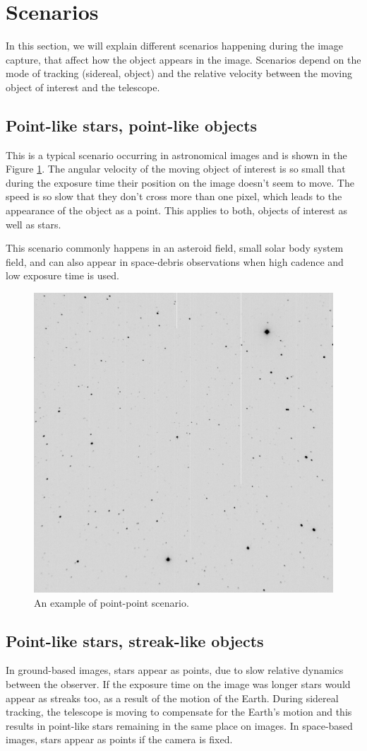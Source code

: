 \section{Scenarios} \label{sec:scenarios}

In this section, we will explain different scenarios happening during the image capture, that affect how the object appears in the image. Scenarios depend on the mode of tracking (sidereal, object) and the relative velocity between the moving object of interest and the telescope. 

\subsection{Point-like stars, point-like objects}
This is a typical scenario occurring in astronomical images and is shown in the Figure \ref{fig:pointpoint1}. The angular velocity of the moving object of interest is so small that during the exposure time their position on the image doesn't seem to move. The speed is so slow that they don't cross more than one pixel, which leads to the appearance of the object as a point. This applies to both, objects of interest as well as stars. 

This scenario commonly happens in an asteroid field, small solar body system field, and can also appear in space-debris observations when high cadence and low exposure time is used. 

\begin{figure}[!h]
    \centering
    \includegraphics[width=.4\textwidth]{images/PointPoint.png}
    \caption{An example of point-point scenario.}
    \label{fig:pointpoint1}
\end{figure}

\subsection{Point-like stars, streak-like objects}
In ground-based images, stars appear as points, due to slow relative dynamics between the observer. If the exposure time on the image was longer stars would appear as streaks too, as a result of the motion of the Earth. 
During sidereal tracking, the telescope is moving to compensate for the Earth's motion and this results in point-like stars remaining in the same place on images.
In space-based images, stars appear as points if the camera is fixed.


